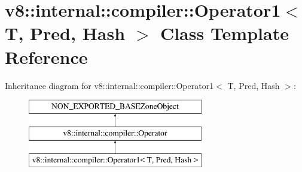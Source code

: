 \hypertarget{classv8_1_1internal_1_1compiler_1_1Operator1}{}\section{v8\+:\+:internal\+:\+:compiler\+:\+:Operator1$<$ T, Pred, Hash $>$ Class Template Reference}
\label{classv8_1_1internal_1_1compiler_1_1Operator1}
Inheritance diagram for v8\+:\+:internal\+:\+:compiler\+:\+:Operator1$<$ T, Pred, Hash $>$\+:\begin{figure}[H]
\begin{center}
\leavevmode
\includegraphics[height=3.000000cm]{classv8_1_1internal_1_1compiler_1_1Operator1}
\end{center}
\end{figure}

